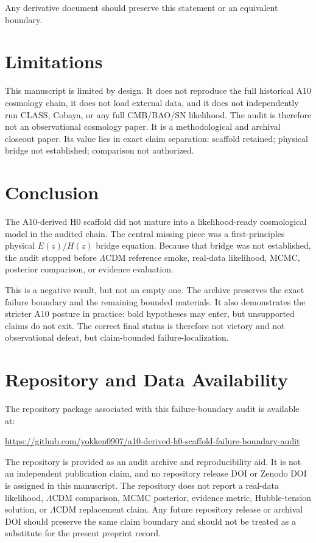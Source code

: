 \documentclass[11pt,a4paper]{article}
\newcommand{\LCDM}{$\Lambda$CDM}
\newcommand{\Ez}{$E(z)$}
\newcommand{\Hz}{$H(z)$}
\begin{document}
Any derivative document should preserve this statement or an equivalent boundary.


\section{Limitations}

This manuscript is limited by design. It does not reproduce the full historical A10 cosmology chain, it does not load external data, and it does not independently run CLASS, Cobaya, or any full CMB/BAO/SN likelihood. The audit is therefore not an observational cosmology paper. It is a methodological and archival closeout paper. Its value lies in exact claim separation: scaffold retained; physical bridge not established; comparison not authorized.

\section{Conclusion}

The A10-derived H0 scaffold did not mature into a likelihood-ready cosmological model in the audited chain. The central missing piece was a first-principles physical \Ez{}/\Hz{} bridge equation. Because that bridge was not established, the audit stopped before \LCDM{} reference smoke, real-data likelihood, MCMC, posterior comparison, or evidence evaluation.

This is a negative result, but not an empty one. The archive preserves the exact failure boundary and the remaining bounded materials. It also demonstrates the stricter A10 posture in practice: bold hypotheses may enter, but unsupported claims do not exit. The correct final status is therefore not victory and not observational defeat, but claim-bounded failure-localization.


\section*{Repository and Data Availability}

The repository package associated with this failure-boundary audit is available at:

\begin{center}
\url{https://github.com/yokken0907/a10-derived-h0-scaffold-failure-boundary-audit}
\end{center}

The repository is provided as an audit archive and reproducibility aid. It is not an independent publication claim, and no repository release DOI or Zenodo DOI is assigned in this manuscript. The repository does not report a real-data likelihood, \LCDM{} comparison, MCMC posterior, evidence metric, Hubble-tension solution, or \LCDM{} replacement claim. Any future repository release or archival DOI should preserve the same claim boundary and should not be treated as a substitute for the present preprint record.
\end{document}
